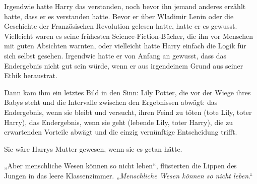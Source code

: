 Irgendwie hatte Harry das verstanden, noch bevor ihn jemand anderes erzählt hatte, dass er es verstanden hatte. Bevor er über Wladimir Lenin oder die Geschichte der Französischen Revolution gelesen hatte, hatte er es gewusst. Vielleicht waren es seine frühesten Science-Fiction-Bücher, die ihn vor Menschen mit guten Absichten warnten, oder vielleicht hatte Harry einfach die Logik für sich selbst gesehen. Irgendwie hatte er von Anfang an gewusst, dass das Endergebnis nicht gut sein würde, wenn er aus irgendeinem Grund aus seiner Ethik heraustrat.

Dann kam ihm ein letztes Bild in den Sinn: Lily Potter, die vor der Wiege ihres Babys steht und die Intervalle zwischen den Ergebnissen abwägt: das Endergebnis, wenn sie bleibt und versucht, ihren Feind zu töten (tote Lily, toter Harry), das Endergebnis, wenn sie geht (lebende Lily, toter Harry), die zu erwartenden Vorteile abwägt und die einzig vernünftige Entscheidung trifft.

Sie wäre Harrys Mutter gewesen, wenn sie es getan hätte.

„Aber menschliche Wesen können so nicht leben“, flüsterten die Lippen des Jungen in das leere Klassenzimmer. „\emph{Menschliche Wesen können so nicht leben}.“


